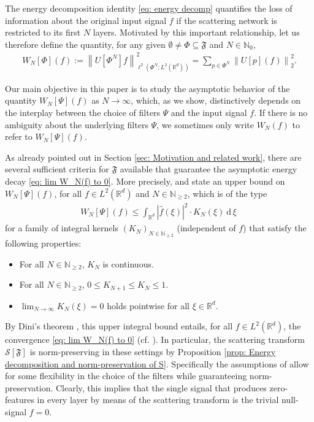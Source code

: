 \documentclass[11pt]{amsart}
\newcommand{\R}{{\mathbb{R}}}
\newcommand{\N}{\mathbb{N}}
\newcommand{\s}{\mathcal{S}}
\newcommand{\dxi}{\:\mathrm{d}\,\xi\:}
\newcommand{\norm}[1]{\ensuremath{\left\lVert\text{}#1\text{}\right\rVert}}
\newenvironment{proof sketch} {\textit{Proof sketch.}}{}
\begin{document}
  The energy decomposition identity \eqref{eq: energy decomp} quantifies the loss of information about the original input signal $f$ if the scattering network is restricted to its first $N$ layers. Motivated by this important relationship, let us therefore define the quantity, for any given $\emptyset \neq \Phi \subseteq \mathfrak{F}$ and $N \in \N_0$, 
  \begin{align}\label{def: energy remainder}
    W_N[\Phi](f):=\norm{U[\Phi^N]f}_{\ell^2(\Phi^N;L^2(\R^d))}^2=\sum_{p \in \Phi^N} \norm{U[p](f)}_2^2.
  \end{align}
  
  Our main objective in this paper is to study the asymptotic behavior of the quantity $W_N[\Psi](f)$ as $N\to \infty$, which, as we show, distinctively depends on the interplay between the choice of filters $\Psi$ and the input signal $f$. 
  If there is no ambiguity about the underlying filters $\Psi$, we sometimes only write $W_N(f)$ to refer to $W_N[\Psi](f)$.
  
  As already pointed out in Section \ref{sec: Motivation and related work}, there are several sufficient criteria for $\mathfrak{F}$ available that guarantee the asymptotic energy decay \eqref{eq: lim W_N(f) to 0}. More precisely, \cite[Theorem 3.1]{waldspurger2017exponential} and \cite[Theorem 1, Theorem 2]{wiatowski2017energy} state an upper bound on $W_N[\Psi](f)$, for all $f \in L^2(\R^d)$ and $N \in \N_{\geq 2}$, which is of the type
  \begin{align}
    W_N[\Psi](f) \leq \int_{\R^d} |\widehat{f}(\xi)|^2 \cdot K_N(\xi) \dxi
  \end{align}
  for a family of integral kernels $(K_N)_{N \in \N_{\geq 2}}$ (independent of $f$) that satisfy the following properties:
  \begin{itemize}
    \item For all $N \in \N_{\geq 2}$, $K_N$ is continuous.
    \item For all $N \in \N_{\geq 2}$, $0\leq K_{N+1} \leq K_N \leq 1$.
    \item $\lim_{N \to \infty} K_N(\xi)=0$ holds pointwise for all $\xi \in \R^d$.
  \end{itemize}
  By Dini's theorem \cite[Theorem 7.3]{dibenedetto2002real}, this upper integral bound entails, for all $f \in L^2(\R^d)$, the convergence \eqref{eq: lim W_N(f) to 0} (cf. \cite[Proposition 2]{wiatowski2017energy}). 
  In particular, the scattering transform $\s[\mathfrak{F}]$ is norm-preserving in these settings by Proposition \ref{prop: Energy decomposition and norm-preservation of S}. Specifically the assumptions of \cite[Theorem 1]{wiatowski2017energy} allow for some flexibility in the choice of the filters while guaranteeing norm-preservation. Clearly, this implies that the single signal that produces zero-features in every layer by means of the scattering transform is the trivial null-signal $f=0$. 
  
\end{document}
